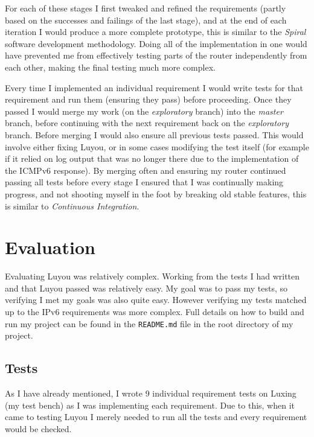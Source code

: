 \documentclass[12pt,a4paper,twoside,openany]{report}
\begin{document}
For each of these stages I first tweaked and refined the requirements (partly based on the successes and failings of the last stage), and at the end of each iteration I would produce a more complete prototype, this is similar to the \textit{Spiral} software development methodology. Doing all of the implementation in one would have prevented me from effectively testing parts of the router independently from each other, making the final testing much more complex.

\bigskip

Every time I implemented an individual requirement I would write tests for that requirement and run them (ensuring they pass) before proceeding.  Once they passed I would merge my work (on the \textit{exploratory} branch) into the \textit{master} branch, before continuing with the next requirement back on the \textit{exploratory} branch.  Before merging I would also ensure all previous tests passed.  This would involve either fixing Luyou, or in some cases modifying the test itself (for example if it relied on log output that was no longer there due to the implementation of the ICMPv6 response).  By merging often and ensuring my router continued passing all tests before every stage I ensured that I was continually making progress, and not shooting myself in the foot by breaking old stable features, this is similar to \textit{Continuous Integration}.

\chapter{Evaluation}

Evaluating Luyou was relatively complex. Working from the tests I had written and that Luyou passed was relatively easy.  My goal was to pass my tests, so verifying I met my goals was also quite easy.  However verifying my tests matched up to the IPv6 requirements was more complex. Full details on how to build and run my project can be found in the \verb!README.md! file in the root directory of my project. 

\section{Tests}

As I have already mentioned, I wrote 9 individual requirement tests on Luxing (my test bench) as I was implementing each requirement.  Due to this, when it came to testing Luyou I merely needed to run all the tests and every requirement would be checked.
\end{document}
